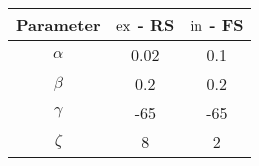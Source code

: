 \begin{tabular}{ccc}
    \hline
    \textbf{Parameter}      & \textbf{${\mathrm{ex}}$ - RS} & \textbf{${\mathrm{in}}$ - FS} \\ \hline
    \textbf{${\alpha}$} & 0.02                                                               & 0.1                                                             \\ 
    \textbf{${\beta}$}  & 0.2                                                                & 0.2                                                             \\ 
    \textbf{${\gamma}$} & -65                                                                & -65                                                             \\ 
    \textbf{${\zeta}$}  & 8                                                                  & 2                                                               \\ \hline
\end{tabular}